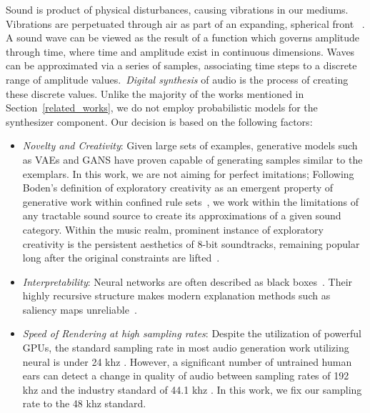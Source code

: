 \documentclass[runningheads,a4paper]{llncs}
\begin{document}
Sound is product of physical disturbances, causing vibrations in our mediums. Vibrations are perpetuated through air as part of an expanding, spherical front ~\cite{cook1999chap4}. A sound wave can be viewed as the result of a function which governs amplitude through time, where time and amplitude exist in continuous dimensions. Waves can be approximated via a series of samples, associating time steps to a discrete range of amplitude values.~\textit{Digital synthesis} of audio is the process of creating these discrete values.
Unlike the majority of the works mentioned in Section~\ref{related_works}, we do not employ probabilistic models for the synthesizer component. Our decision is based on the following factors:
\begin{itemize}
    \item \textit{Novelty and Creativity}: Given large sets of examples, generative models such as VAEs and GANS have proven capable of generating samples similar to the exemplars. In this work, we are not aiming for perfect imitations; Following Boden's definition of exploratory creativity as an emergent property of generative work within confined rule sets~\cite{boden2009computer}, we work within the limitations of any tractable sound source to create its  approximations of a given sound category. Within the music realm, prominent instance of exploratory creativity is the persistent aesthetics of 8-bit soundtracks, remaining popular long after the original constraints are lifted~\cite{collins2007loop}.
    \item \textit{Interpretability}: Neural networks are often described as black boxes~\cite{basheer2000artificial}. Their highly recursive structure makes modern explanation methods such as saliency maps unreliable~\cite{rudin2019stop}.  
    \item \textit{Speed of Rendering at high sampling rates}: Despite the utilization of powerful GPUs, the standard sampling rate in most audio generation work utilizing neural is under 24 khz \cite{yamamoto2020parallel,oord2017parallel,aouameur2019neural,ramires2020neural}. However, a significant number of untrained human ears can detect a change in quality of audio between sampling rates of 192 khz and the industry standard of 44.1 khz \cite{reiss2016meta}. In this work, we fix our sampling rate to the 48 khz standard. 
\end{itemize}
\end{document}
